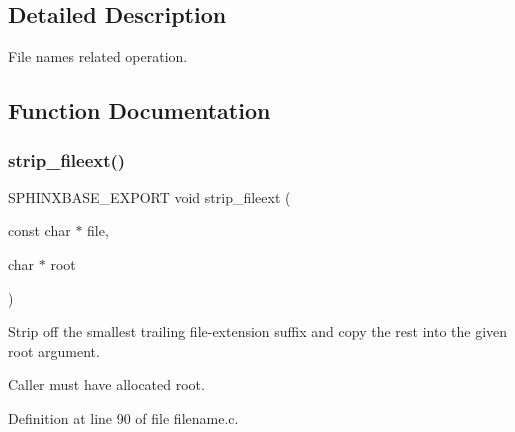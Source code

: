 \subsection{Detailed Description}
File names related operation. 



\subsection{Function Documentation}
\mbox{\label{filename_8h_ad40b54252813d276ff2ebb097b242657}} 
\subsubsection{strip\+\_\+fileext()}
{\footnotesize\ttfamily S\+P\+H\+I\+N\+X\+B\+A\+S\+E\+\_\+\+E\+X\+P\+O\+RT void strip\+\_\+fileext (\begin{DoxyParamCaption}\item[{const char $\ast$}]{file,  }\item[{char $\ast$}]{root }\end{DoxyParamCaption})}



Strip off the smallest trailing file-\/extension suffix and copy the rest into the given root argument. 

Caller must have allocated root. 

Definition at line 90 of file filename.\+c.

